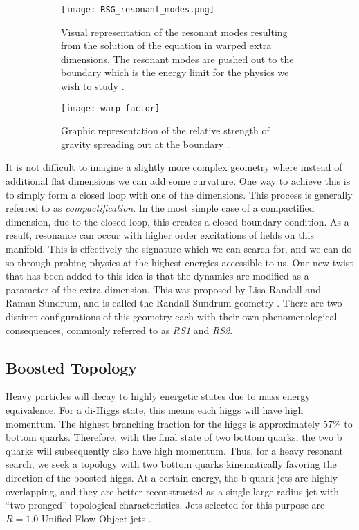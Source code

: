 \documentclass[12pt]{article}
\begin{document}
\begin{figure}[t]
    \centering
    \begin{subfigure}[t]{.48\textwidth}
        \centering
        \texttt{[image: RSG\_resonant\_modes.png]}
        \caption{Visual representation of the resonant modes resulting from the
        solution of the equation in warped extra dimensions. The resonant modes
        are pushed out to the boundary which is the energy limit for the physics we
        wish to study \cite{bsm}.}
        \label{subfig:RSG_resonant_modes}
    \end{subfigure}
    \hfill
    \begin{subfigure}[t]{.48\textwidth}
        \centering
        \texttt{[image: warp\_factor]}
        \caption{Graphic representation of the relative strength of gravity
        spreading out at the boundary \cite{bsm}.}
        \label{subfig:warp_factor}
    \end{subfigure}
\caption{}
\label{fig:theoretical_motivation_figure}
\end{figure}

It is not difficult to imagine a slightly more complex geometry where instead of
additional flat dimensions we can add some curvature. One way to achieve this is
to simply form a closed loop with one of the dimensions. This process is
generally referred to as \textit{compactification}. In the most simple case of a
compactified dimension, due to the closed loop, this creates a closed boundary
condition. As a result, resonance can occur with higher order excitations of
fields on this manifold. This is effectively the signature which we can search
for, and we can do so through probing physics at the highest energies accessible
to us. One new twist that has been added to this idea is that the dynamics are
modified as a parameter of the extra dimension. This was proposed by Lisa
Randall and Raman Sundrum, and is called the Randall-Sundrum geometry
\cite{RandallSundrumOriginal, bsm}. There are two distinct configurations of
this geometry each with their own phenomenological consequences, commonly
referred to as \textit{RS1} and \textit{RS2}.


\subsection{Boosted Topology}
Heavy particles will decay to highly energetic states due to mass energy
equivalence. For a di-Higgs state, this means each higgs will have high
momentum. The highest branching fraction for the higgs is approximately 57\% to
bottom quarks. Therefore, with the final state of two bottom quarks, the two b
quarks will subsequently also have high momentum. Thus, for a heavy resonant
search, we seek a topology with two bottom quarks kinematically favoring the
direction of the boosted higgs. At a certain energy, the b quark jets are highly
overlapping, and they are better reconstructed as a single large radius jet with
``two-pronged'' topological characteristics. Jets selected for this purpose are
$R=1.0$ Unified Flow Object jets \cite{boosted_hbbcc_tagger, large_r_jet}. 
\end{document}
